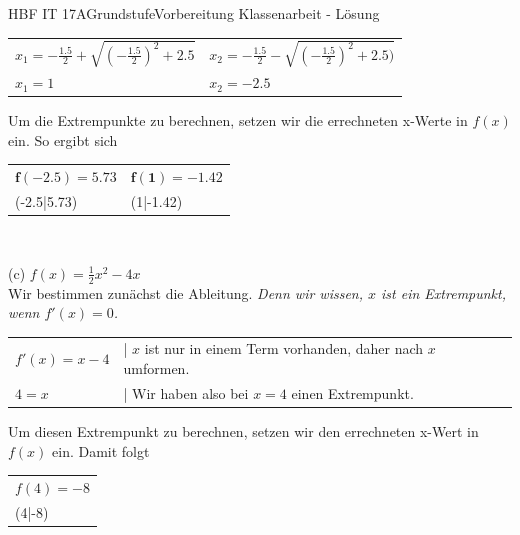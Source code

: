\documentclass[oneside,openany,headings=optiontotoc,11pt,numbers=noenddot]{scrreprt}
\begin{document}
\begin{worksheet}{HBF IT 17A}{Grundstufe}{Vorbereitung Klassenarbeit - Lösung}
\begin{framed}
\begin{tabularx}{\textwidth}{XX}
				\multicolumn{1}{X|}{\(x_1 = -\frac{1.5}{2} + \sqrt{(-\frac{1.5}{2})^2 + 2.5}\)} & \multicolumn{1}{X}{\(x_2 = -\frac{1.5}{2} - \sqrt{(-\frac{1.5}{2})^2 + 2.5)}\)}\\
				\multicolumn{1}{X|}{\(x_1 = 1\)} & \multicolumn{1}{X}{\(x_2 = -2.5\)}\\
			\end{tabularx}
			Um die Extrempunkte zu berechnen, setzen wir die errechneten x-Werte in \(f(x)\) ein. So ergibt sich\\
			\begin{tabularx}{\textwidth}{XX}
				\(\mathbf{f(-2.5)} = 5.73\) & \(\mathbf{f(1)} = -1.42\)\\
				(-2.5|5.73) & (1|-1.42)
			\end{tabularx}\\
			\par\bigskip\noindent
			(c) \(f(x) = \frac{1}{2}x^2 -4x\)\\
			Wir bestimmen zunächst die Ableitung. \small{\textit{Denn wir wissen, \(x\) ist ein Extrempunkt, wenn \(f'(x) = 0\).}}\\
			\normalsize
			\begin{tabularx}{\textwidth}{XXX}
				\(f'(x) = x-4\) & | \(x\) ist nur in einem Term vorhanden, daher nach \(x\) umformen.\\
				\(4 = x\) & | Wir haben also bei \(x = 4\) einen Extrempunkt.\\
			\end{tabularx}
			Um diesen Extrempunkt zu berechnen, setzen wir den errechneten x-Wert in \(f(x)\) ein. Damit folgt\\
			\begin{tabularx}{\textwidth}{X}
				\(f(4) = -8\)\\
				(4|-8)
			\end{tabularx}
		\end{framed}
	\end{worksheet}
\end{document}
